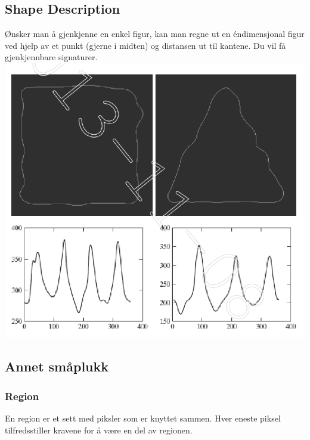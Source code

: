 \subsection{Shape Description}
Ønsker man å gjenkjenne en enkel figur, kan man regne ut en éndimensjonal figur ved hjelp av et punkt (gjerne i midten) og distansen ut til kantene. Du vil få gjenkjennbare signaturer.
\\ \includegraphics[width=\textwidth]{Bilder/sign.png}
\subsection{Annet småplukk}

\subsubsection{Region}
En region er et sett med piksler som er knyttet sammen. Hver eneste piksel tilfredsstiller kravene for å være en del av regionen.


















































